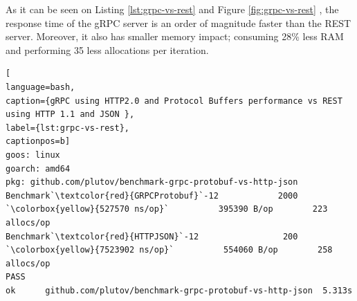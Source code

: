 As it can be seen on Listing \ref{lst:grpc-vs-rest} and Figure \ref{fig:grpc-vs-rest} , the response time of the gRPC server is an order of magnitude faster than the REST server. Moreover, it also has smaller memory impact; consuming  28\% less RAM and performing 35 less allocations per iteration. 

\begin{lstlisting}[
language=bash,
caption={gRPC using HTTP2.0 and Protocol Buffers performance vs REST using HTTP 1.1 and JSON },
label={lst:grpc-vs-rest},
captionpos=b]
goos: linux
goarch: amd64
pkg: github.com/plutov/benchmark-grpc-protobuf-vs-http-json
Benchmark`\textcolor{red}{GRPCProtobuf}`-12            2000            `\colorbox{yellow}{527570 ns/op}`          395390 B/op        223 allocs/op
Benchmark`\textcolor{red}{HTTPJSON}`-12                 200           `\colorbox{yellow}{7523902 ns/op}`          554060 B/op        258 allocs/op
PASS
ok      github.com/plutov/benchmark-grpc-protobuf-vs-http-json  5.313s
\end{lstlisting}

